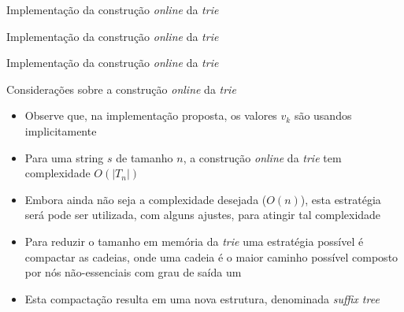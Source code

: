 

\begin{frame}[fragile]{Implementação da construção {\it online} da {\it trie}}
\end{frame}

\begin{frame}[fragile]{Implementação da construção {\it online} da {\it trie}}
\end{frame}

\begin{frame}[fragile]{Implementação da construção {\it online} da {\it trie}}
\end{frame}

\begin{frame}[fragile]{Considerações sobre a construção {\it online} da {\it trie}}

    \begin{itemize}
        \item Observe que, na implementação proposta, os valores $v_k$ são usandos implicitamente

        \item Para uma string $s$ de tamanho $n$, a construção \textit{online} da \textit{trie}
            tem complexidade $O(|T_n|)$

        \item Embora ainda não seja a complexidade desejada ($O(n)$), esta estratégia será 
            pode ser utilizada, com alguns ajustes, para atingir tal complexidade

        \item Para reduzir o tamanho em memória da \textit{trie} uma estratégia possível é 
            compactar as cadeias, onde uma cadeia é o maior caminho possível composto por nós 
            não-essenciais com grau de saída um 

        \item Esta compactação resulta em uma nova estrutura, denominada \textit{suffix tree}
    \end{itemize}

\end{frame}
